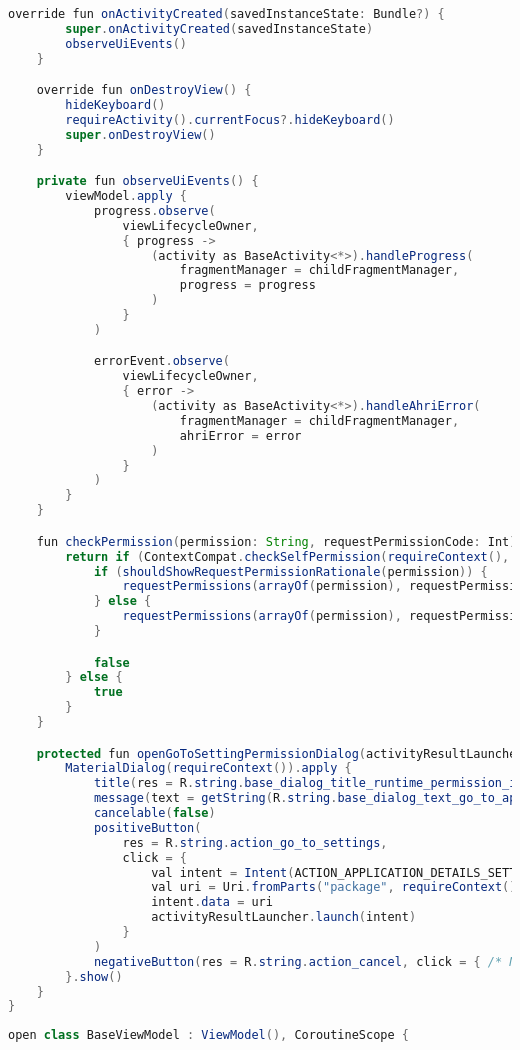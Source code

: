 \begin{asection}
\begin{lstlisting}[language=Java,label={lst:add:a_2}, caption={BaseFragment}]
    override fun onActivityCreated(savedInstanceState: Bundle?) {
        super.onActivityCreated(savedInstanceState)
        observeUiEvents()
    }

    override fun onDestroyView() {
        hideKeyboard()
        requireActivity().currentFocus?.hideKeyboard()
        super.onDestroyView()
    }

    private fun observeUiEvents() {
        viewModel.apply {
            progress.observe(
                viewLifecycleOwner,
                { progress ->
                    (activity as BaseActivity<*>).handleProgress(
                        fragmentManager = childFragmentManager,
                        progress = progress
                    )
                }
            )

            errorEvent.observe(
                viewLifecycleOwner,
                { error ->
                    (activity as BaseActivity<*>).handleAhriError(
                        fragmentManager = childFragmentManager,
                        ahriError = error
                    )
                }
            )
        }
    }

    fun checkPermission(permission: String, requestPermissionCode: Int): Boolean {
        return if (ContextCompat.checkSelfPermission(requireContext(), permission) != PackageManager.PERMISSION_GRANTED) {
            if (shouldShowRequestPermissionRationale(permission)) {
                requestPermissions(arrayOf(permission), requestPermissionCode)
            } else {
                requestPermissions(arrayOf(permission), requestPermissionCode)
            }

            false
        } else {
            true
        }
    }

    protected fun openGoToSettingPermissionDialog(activityResultLauncher: ActivityResultLauncher<Intent>) {
        MaterialDialog(requireContext()).apply {
            title(res = R.string.base_dialog_title_runtime_permission_is_denied)
            message(text = getString(R.string.base_dialog_text_go_to_application_settings))
            cancelable(false)
            positiveButton(
                res = R.string.action_go_to_settings,
                click = {
                    val intent = Intent(ACTION_APPLICATION_DETAILS_SETTINGS)
                    val uri = Uri.fromParts("package", requireContext().packageName, null)
                    intent.data = uri
                    activityResultLauncher.launch(intent)
                }
            )
            negativeButton(res = R.string.action_cancel, click = { /* Nothing */ })
        }.show()
    }
}
\end{lstlisting}
\hfill \break
\begin{lstlisting}[language=Java,label={lst:add:a_3}, caption={BaseViewModel}]
open class BaseViewModel : ViewModel(), CoroutineScope {


\end{lstlisting}
\end{asection}
